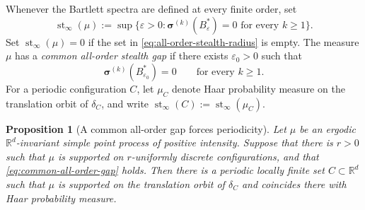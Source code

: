\documentclass[11pt,reqno,a4paper]{amsart}
\numberwithin{equation}{section}
\theoremstyle{compact}
\newtheorem{proposition}[proposition]{Proposition}
\theoremstyle{definition}
\theoremstyle{definition}
\begin{document}
Whenever the Bartlett spectra are defined at every finite order, set
\begin{equation}\label{eq:all-order-stealth-radius}
  \operatorname{st}_\infty(\mu)
  :=\sup\bigl\{\varepsilon>0:
  \boldsymbol\sigma^{(k)}(B_\varepsilon^*)=0
  \text{ for every }k\geq1\bigr\}.
\end{equation}
Set $\operatorname{st}_\infty(\mu)=0$ if the set in
\eqref{eq:all-order-stealth-radius} is empty.  The measure $\mu$ has a
\emph{common all-order stealth gap} if there exists
$\varepsilon_0>0$ such that
\begin{equation}\label{eq:common-all-order-gap}
  \boldsymbol\sigma^{(k)}(B_{\varepsilon_0}^*)=0
  \qquad\text{for every }k\geq1.
\end{equation}
For a periodic configuration $C$, let $\mu_C$ denote Haar probability
measure on the translation orbit of $\delta_C$, and write
$\operatorname{st}_\infty(C):=\operatorname{st}_\infty(\mu_C)$.

\begin{proposition}[A common all-order gap forces periodicity]
\label{prop:common-gap-periodic}
Let $\mu$ be an ergodic $\mathbb R^d$-invariant simple point process of positive
intensity.  Suppose that there is $r>0$ such that $\mu$ is supported on
$r$-uniformly discrete configurations, and that \eqref{eq:common-all-order-gap}
holds.  Then there is a periodic locally finite set $C\subset\mathbb R^d$ such
that $\mu$ is supported on the translation orbit of $\delta_C$ and coincides
there with Haar probability measure.
\end{proposition}
\end{document}
